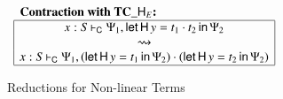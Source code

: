 \documentclass{lmcs}
\newcommand{\func}[1]{\mathsf{#1}}
\newcommand{\DualLNLLogicnt}[1]{\mathit{#1}}
\newcommand{\DualLNLLogicmv}[1]{\mathit{#1}}
\newcommand{\DualLNLLogicsym}[1]{#1}
\newcommand{\DualLNLLogicdrulename}[1]{\textsc{#1}}
\newcommand{\DualLNLLogicdruleTCXXHEName}[0]{\DualLNLLogicdrulename{TC\_HE}}
\renewcommand{\DualLNLLogicdrulename}[1]{#1}
\renewcommand{\DualLNLLogicdruleTCXXHEName}{\text{TC\_}\func{H}_E}
\begin{document}
\begin{figure}
\begin{mdframed}
\begin{center}
\begin{math}
\begin{array}{c}
\begin{array}{|c|}
        \hline
      \end{array}\\
      \\
      \begin{array}{|c|}
        \multicolumn{1}{l}{\textbf{\textbf{Contraction with $\DualLNLLogicdruleTCXXHEName{}$}:}}\\
        \hline
         \DualLNLLogicmv{x}  :  \DualLNLLogicnt{S}  \vdash_{\mathsf{C} }  \Psi_{{\mathrm{1}}}  \DualLNLLogicsym{,}   \mathsf{let}\,\mathsf{H}\, \DualLNLLogicmv{y}  =   \DualLNLLogicnt{t_{{\mathrm{1}}}}  \cdot  \DualLNLLogicnt{t_{{\mathrm{2}}}}  \,\mathsf{in}\, \Psi_{{\mathrm{2}}}  \\
        \rightsquigarrow\\
         \DualLNLLogicmv{x}  :  \DualLNLLogicnt{S}  \vdash_{\mathsf{C} }  \Psi_{{\mathrm{1}}}  \DualLNLLogicsym{,}  \DualLNLLogicsym{(}   \mathsf{let}\,\mathsf{H}\, \DualLNLLogicmv{y}  =  \DualLNLLogicnt{t_{{\mathrm{1}}}} \,\mathsf{in}\, \Psi_{{\mathrm{2}}}   \DualLNLLogicsym{)}  \cdot  \DualLNLLogicsym{(}   \mathsf{let}\,\mathsf{H}\, \DualLNLLogicmv{y}  =  \DualLNLLogicnt{t_{{\mathrm{2}}}} \,\mathsf{in}\, \Psi_{{\mathrm{2}}}   \DualLNLLogicsym{)} \\
        \hline
      \end{array}\\      
    \end{array}
  \end{math}
  \end{center}
  \end{mdframed}
  \caption{Reductions for Non-linear Terms}
  \label{fig:red-non-linear}
\end{figure}
\end{document}
